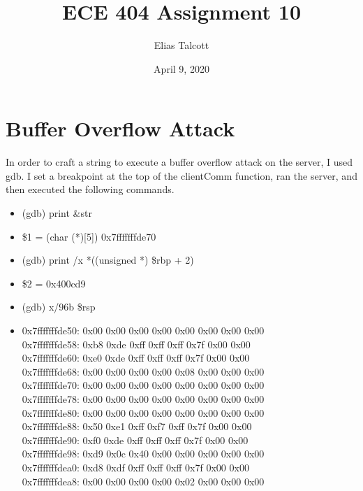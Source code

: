 \documentclass[11pt]{article}
\def \myTitle {ECE 404 Assignment 10}
\def \myName {Elias Talcott}
\def \myDate {April 9, 2020}
\begin{document}
\begin{titlepage}
\title{\myTitle}
\author{\myName}
\date{\myDate}
\maketitle
\vspace{1in}
\tableofcontents
\thispagestyle{empty}
\end{titlepage}


\section{Buffer Overflow Attack}

In order to craft a string to execute a buffer overflow attack on the server, I used gdb. I set a breakpoint at the top of the clientComm function, ran the server, and then executed the following commands.

\begin{itemize}
\item (gdb) print \&str
\item \$1 = (char (*)[5]) 0x7fffffffde70
\item (gdb) print /x *((unsigned *) \$rbp + 2)
\item \$2 = 0x400cd9
\item (gdb) x/96b \$rsp
\item 
0x7fffffffde50:	0x00	0x00	0x00	0x00	0x00	0x00	0x00	0x00\\
0x7fffffffde58:	0xb8	0xde	0xff	0xff	0xff	0x7f	0x00	0x00\\
0x7fffffffde60:	0xe0	0xde	0xff	0xff	0xff	0x7f	0x00	0x00\\
0x7fffffffde68:	0x00	0x00	0x00	0x00	0x08	0x00	0x00	0x00\\
0x7fffffffde70:	0x00	0x00	0x00	0x00	0x00	0x00	0x00	0x00\\
0x7fffffffde78:	0x00	0x00	0x00	0x00	0x00	0x00	0x00	0x00\\
0x7fffffffde80:	0x00	0x00	0x00	0x00	0x00	0x00	0x00	0x00\\
0x7fffffffde88:	0x50	0xe1	0xff	0xf7	0xff	0x7f	0x00	0x00\\
0x7fffffffde90:	0xf0	0xde	0xff	0xff	0xff	0x7f	0x00	0x00\\
0x7fffffffde98:	0xd9	0x0c	0x40	0x00	0x00	0x00	0x00	0x00\\
0x7fffffffdea0:	0xd8	0xdf	0xff	0xff	0xff	0x7f	0x00	0x00\\
0x7fffffffdea8:	0x00	0x00	0x00	0x00	0x02	0x00	0x00	0x00
\end{itemize}
\end{document}
